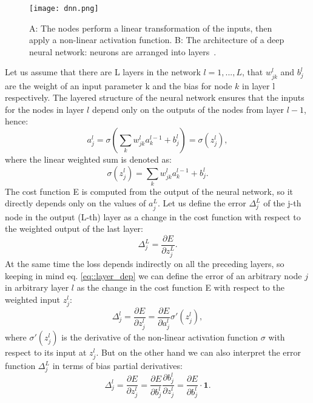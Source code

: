 \begin{figure}[htpb]
	\centering
	\texttt{[image: dnn.png]}
	\caption{A: The nodes perform a linear transformation of the inputs, then apply a non-linear activation function. B: The architecture of a deep neural network: neurons are arranged into layers~\cite{dnn1}. }
	\label{fig::dnn}
\end{figure}
Let us assume that there are L layers in the network $l=1,...,L$, that $w^l_{jk}$ and $b^l_j$ are the weight of an input parameter k and the bias for node $k$ in layer l respectively. The layered structure of the neural network ensures that the inputs for the nodes in layer $l$ depend only on the outputs of the nodes from layer $l-1$, hence:
\begin{equation}
\label{eq::layer_dep}
a^l_j=\sigma\left(\sum_k w^l_{jk}a^{l-1}_k + b_j^l \right) = \sigma(z^l_j),
\end{equation}
where the linear weighted sum is denoted as:
\begin{equation}
\sigma(z^l_j)=\sum_k w^l_{jk}a^{l-1}_k + b_j^l.
\end{equation}
The cost function E is computed from the output of the neural network, so it directly depends only on the values of $a_j^L$. Let us define the error $\Delta_j^L$ of the j-th node in the output (L-th) layer as a change in the cost function with respect to the weighted output of the last layer:
\begin{equation}
\label{eq::bp1}
\Delta^L_j=\frac{\partial E}{\partial z_j^L}.
\end{equation}
At the same time the loss depends indirectly on all the preceding layers, so keeping in mind eq. \ref{eq::layer_dep} we can define the error of an arbitrary node $j$ in arbitrary layer $l$ as the change in the cost function E with respect to the weighted input $z^l_j$:
\begin{equation}
\Delta^l_j=\frac{\partial E}{\partial z_j^l}=\frac{\partial E}{\partial a^l_j}\sigma'(z^l_j),
\end{equation}
where $\sigma'(z^l_j)$ is the derivative of the non-linear activation function $\sigma$ with respect to its input at $z^l_j$. But on the other hand we can also interpret the error function  $\Delta^L_j$ in terms of bias partial derivatives:
\begin{equation}
\label{eq::bp2}
\Delta^l_j=\frac{\partial E}{\partial z_j^l}=\frac{\partial E}{\partial b^l_j}\frac{\partial b_j^l}{\partial z_j^l}=\frac{\partial E}{\partial b^l_j}\cdot \textbf{1}.
\end{equation}
